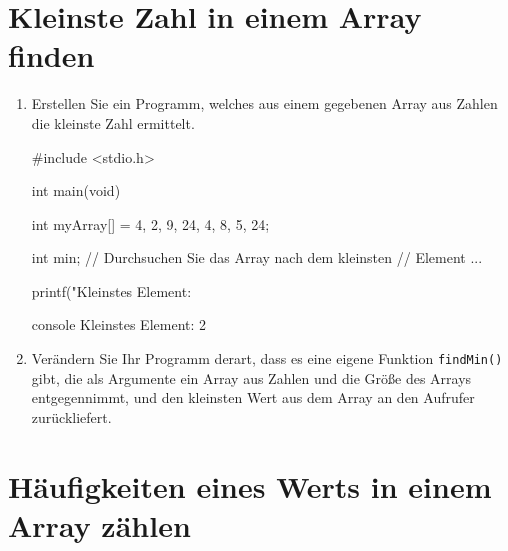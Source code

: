 
\chapter{Kleinste Zahl in einem Array finden}


\begin{enumerate}
  \item Erstellen Sie ein Programm, welches aus einem gegebenen Array aus
  Zahlen die kleinste Zahl ermittelt.

\Vorlage
\begin{codebox}[lang=c, fontsize=\small]
#include <stdio.h>

int main(void) {
    int myArray[] = {4, 2, 9, 24, 4, 8, 5, 24};

    int min;
    // Durchsuchen Sie das Array nach dem kleinsten
    // Element ...

    printf("Kleinstes Element: %
}
\end{codebox}

\begin{mybox}[Bildschirmausgabe]{console}
Kleinstes Element: 2
\end{mybox}

\item Verändern Sie Ihr Programm derart, dass es eine eigene Funktion
\texttt{findMin()} gibt, die als Argumente ein Array aus Zahlen und die
Größe des Arrays entgegennimmt, und den kleinsten Wert aus dem Array an den
Aufrufer zurückliefert.
\end{enumerate}




\chapter{Häufigkeiten eines Werts in einem Array zählen}


